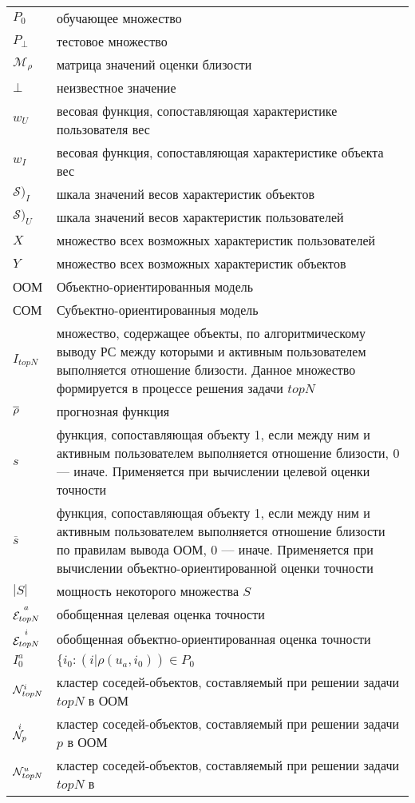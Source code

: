 \begin{longtable}{p{3cm}p{13cm}}
	$P_0$ & обучающее множество \\
	$P_{\bot}$ & тестовое множество \\
	$\mathcal{M}_{\rho}$ & матрица значений оценки близости\\
	$\bot$ & неизвестное значение\\
	$w_U$ & весовая функция, сопоставляющая характеристике пользователя вес\\
	$w_I$ & весовая функция, сопоставляющая характеристике объекта вес\\
	$\mathcal{S})_I$ & шкала значений весов характеристик объектов\\
	$\mathcal{S})_U$ & шкала значений весов характеристик пользователей\\
	$X$ & множество всех возможных характеристик пользователей \\
	$Y$ & множество всех возможных характеристик объектов \\
	ООМ & Объектно-ориентированныя модель \\
	СОМ & Субъектно-ориентированныя модель \\
	$I_{topN}$ & множество, содержащее объекты, по алгоритмическому
	выводу РС между которыми и активным пользователем выполняется отношение
	близости. Данное множество формируется в процессе решения задачи $topN$ \\
	$\overline{\rho}$ & прогнозная функция \\
	$s$ & функция, сопоставляющая объекту 1, если между ним и активным
	пользователем выполняется отношение близости, 0 --- иначе. Применяется при вычислении
	целевой оценки точности\\
	$\overline{s}$ & функция, сопоставляющая объекту 1, если между ним и активным
	пользователем выполняется отношение близости по правилам вывода ООМ,
	0 --- иначе. Применяется при вычислении объектно-ориентированной оценки точности\\
	$|S|$ & мощность некоторого множества $S$\\
	${\overset{a}{\mathcal{E}_{topN}}}$ & обобщенная целевая оценка точности \\
	${\overset{i}{\mathcal{E}_{topN}}}$ & обобщенная объектно-ориентированная оценка точности \\
	$I^a_0$ & $\{i_0: (i | \rho(u_a, i_0)) \in P_0$ \\
	${\mathcal{N}^i_{topN}}$ & кластер соседей-объектов, составляемый при решении задачи $topN$ в
	ООМ\\
	${\overset{i}{\mathcal{N}_p}}$ & кластер соседей-объектов, составляемый при решении задачи $p$ в
	ООМ\\
	${\mathcal{N}^u_{topN}}$ & кластер соседей-объектов, составляемый при решении задачи $topN$ в

\end{longtable}
